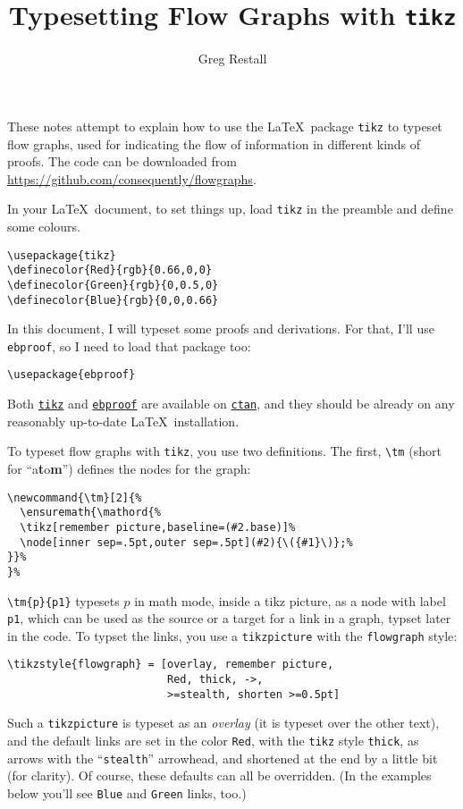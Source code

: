 \documentclass{article}
\newcommand{\tm}[2]{%
  \ensuremath{\mathord{%
  \tikz[remember picture,baseline=(#2.base)]%
  \node[inner sep=.5pt,outer sep=.5pt](#2){\({#1}\)};%
}}%
}%
\begin{document}
\title{Typesetting Flow Graphs with \texttt{tikz}}
\author{Greg Restall}
\maketitle
\noindent%
These notes attempt to explain how to use the \LaTeX\ package \texttt{tikz} to typeset flow graphs, used for indicating the flow of information in different kinds of proofs. The code can be downloaded from \url{https://github.com/consequently/flowgraphs}.

In your \LaTeX\ document, to set things up, load \texttt{tikz} in the preamble and define some colours.
\begin{Verbatim}
\usepackage{tikz}
\definecolor{Red}{rgb}{0.66,0,0}
\definecolor{Green}{rgb}{0,0.5,0}
\definecolor{Blue}{rgb}{0,0,0.66}
\end{Verbatim}
In this document, I will typeset some proofs and derivations. For that, I'll use \texttt{ebproof}, so I need to load that package too:
\begin{Verbatim}
\usepackage{ebproof}
\end{Verbatim}
Both \texttt{\href{https://ctan.org/pkg/pgf}{tikz}} and \texttt{\href{https://ctan.org/pkg/ebproof}{ebproof}} are available on \texttt{\href{http://ctan.org}{ctan}}, and they should be already on any reasonably up-to-date \LaTeX\ installation. 

To typeset flow graphs with \texttt{tikz}, you use two definitions. The first, \Verb|\tm| (short for ``a\textbf{t}o\textbf{m}'') defines the nodes for the graph:
\begin{Verbatim}
\newcommand{\tm}[2]{%
  \ensuremath{\mathord{%
  \tikz[remember picture,baseline=(#2.base)]%
  \node[inner sep=.5pt,outer sep=.5pt](#2){\({#1}\)};%
}}%
}%
\end{Verbatim}
\Verb|\tm{p}{p1}| typesets $p$ in math mode, inside a tikz picture, as a node with label \Verb|p1|, which can be used as the source or a target for a link in a graph, typset later in the code.  To typset the links, you use a \texttt{tikzpicture} with the \Verb|flowgraph| style:  
\begin{Verbatim}
\tikzstyle{flowgraph} = [overlay, remember picture,
                         Red, thick, ->,
                         >=stealth, shorten >=0.5pt]
\end{Verbatim}
Such a \texttt{tikzpicture} is typeset as an \emph{overlay} (it is typeset over the other text), and the default links are set in the color \texttt{Red}, with the \texttt{tikz} style \texttt{thick}, as arrows with the ``\texttt{stealth}'' arrowhead, and shortened at the end by a little bit (for clarity). Of course, these defaults can all be overridden. (In the examples below you'll see \texttt{Blue} and \texttt{Green} links, too.)
\end{document}
